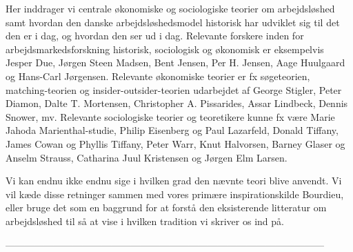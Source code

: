 Her inddrager vi centrale økonomiske og sociologiske teorier om arbejdsløshed samt hvordan den danske arbejdsløshedsmodel historisk har udviklet sig til det den er i dag, og hvordan den ser ud i dag. Relevante forskere inden for arbejdsmarkedsforskning historisk, sociologisk og økonomisk er eksempelvis Jesper Due, Jørgen Steen Madsen, Bent Jensen, Per H. Jensen, Aage Huulgaard og Hans-Carl Jørgensen. Relevante økonomiske teorier er fx søgeteorien, matching-teorien og insider-outsider-teorien udarbejdet af George Stigler, Peter Diamon, Dalte T. Mortensen, Christopher A. Pissarides, Assar Lindbeck, Dennis Snower, mv. Relevante sociologiske teorier og teoretikere kunne fx være Marie Jahoda  Marienthal-studie, Philip Eisenberg og Paul Lazarfeld, Donald Tiffany, James Cowan og Phyllis Tiffany, Peter Warr, Knut Halvorsen, Barney Glaser og Anselm Strauss, Catharina Juul Kristensen og Jørgen Elm Larsen.

Vi kan endnu ikke endnu sige i hvilken grad den nævnte teori blive anvendt. Vi vil kæde disse retninger sammen med vores primære inspirationskilde Bourdieu, eller bruge det som en baggrund for at forstå den eksisterende litteratur om arbejdsløshed til så at vise i hvilken tradition vi skriver os ind på.


---------------------------------------------------------------------------------------------------



